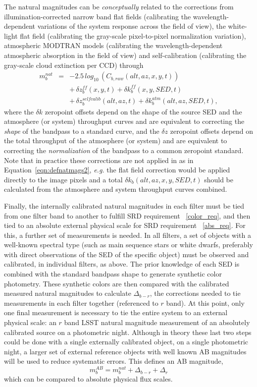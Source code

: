 \documentclass[12pt,preprint]{aastex}
\begin{document}
The natural magnitudes can be {\it conceptually} related to the corrections
from illumination-corrected narrow band flat fields (calibrating the
wavelength-dependent variations of the system response across the
field of view), the white-light flat field (calibrating the gray-scale pixel-to-pixel
normalization variation), atmospheric MODTRAN models (calibrating the
wavelength-dependent atmospheric absorption in the field of view) and
self-calibration (calibrating the gray-scale cloud extinction per CCD)
through
\begin{eqnarray}
\label{eqn:defnatmags2}
m_b^{nat} & = &-2.5 \, log_{10} \, (C_{b, raw}(alt,az,x,y,t))
\nonumber \\ 
 & & +\, \delta z_b^{ff}(x,y,t) + \delta k_b^{ff}(x,y,SED,t)  \nonumber \\  
 & &+\, \delta z_b^{selfcalib}(alt,az,t)  + \delta k_b^{atm}(alt,az,SED,t), 
\end{eqnarray}
where the $\delta k$ zeropoint offsets depend on the shape of the
source SED and the atmosphere (or system) throughput curves and are
equivalent to correcting the {\it shape} of the bandpass to a standard
curve, and the $\delta z$ zeropoint offsets depend on the total
throughput of the atmosphere (or system) and are equivalent to
correcting the {\it normalization} of the bandpass to a common
zeropoint standard. Note that in practice these corrections are not
applied in as in Equation~\ref{eqn:defnatmags2}, {\it e.g.} the flat
field correction would be applied directly to the image pixels and a
total $\delta k_b(alt,az,x,y,SED,t)$ should be calculated from the
atmosphere and system throughput curves combined.

Finally, the internally calibrated natural magnitudes in each filter
must be tied from one filter band to another to fulfill SRD
requirement ~\ref{color_req}, and then tied to an absolute external
physical scale for SRD requirement ~\ref{abs_req}.  For this, a
further set of measurements is needed. In all filters, a set of
objects with a well-known spectral type (such as main sequence stars
or white dwarfs, preferably with direct observations of the SED of the
specific object) must be observed and calibrated, in individual
filters, as above. The prior knowledge of each SED is combined with
the standard bandpass shape to generate synthetic color
photometry. These synthetic colors are then compared with the
calibrated measured natural magnitudes to calculate $\Delta_{b-r}$,
the corrections needed to tie measurements in each filter together
(referenced to $r$ band).  At this point, only one final measurement
is necessary to tie the entire system to an external physical scale:
an $r$ band LSST natural magnitude measurement of an absolutely
calibrated source on a photometric night. Although in theory these
last two steps could be done with a single externally calibrated
object, on a single photometric night, a larger set of external
reference objects with well known AB magnitudes will be used to reduce
systematic errors. This defines an AB magnitude,
\begin{equation}
\label{eqn:extmags}
m_b^{AB} = m_b^{nat}  + \Delta_{b-r} + \Delta_r
\end{equation}
which can be compared to absolute physical flux scales. 
\end{document}
